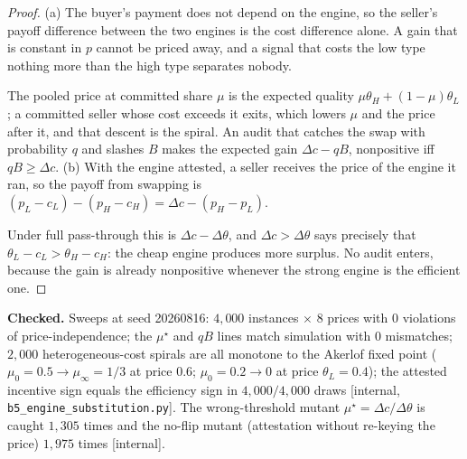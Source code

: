 \documentclass[11pt,a4paper]{article}
\theoremstyle{definition}
\begin{document}
\begin{proof}
\setlength{\parskip}{4pt plus 1pt}
(a) The buyer's payment does not depend on the engine, so the seller's payoff
difference between the two engines is the cost difference alone. A gain that
is constant in $p$ cannot be priced away, and a signal that costs the low type
nothing more than the high type separates nobody. 

The pooled price at
committed share $\mu$ is the expected quality $\mu\theta_H+(1-\mu)\theta_L$;
a committed seller whose cost exceeds it exits, which lowers $\mu$ and the
price after it, and that descent is the spiral. An audit that catches the
swap with probability $q$ and slashes $B$ makes the expected gain
$\Delta c-qB$, nonpositive iff $qB\ge\Delta c$.
(b) With the engine attested, a seller receives the price of the engine it
ran, so the payoff from swapping is $(p_L-c_L)-(p_H-c_H)=\Delta c-(p_H-p_L)$.


Under full pass-through this is $\Delta c-\Delta\theta$, and
$\Delta c>\Delta\theta$ says precisely that $\theta_L-c_L>\theta_H-c_H$: the
cheap engine produces more surplus. No audit enters, because the gain is
already nonpositive whenever the strong engine is the efficient one.
\end{proof}

\noindent\textbf{Checked.} Sweeps at seed 20260816: $4{,}000$ instances
$\times$ $8$ prices with $0$ violations of price-independence; the
$\mu^\star$ and $qB$ lines match simulation with $0$ mismatches; $2{,}000$
heterogeneous-cost spirals are all monotone to the Akerlof fixed point
($\mu_0=0.5\to\mu_\infty=1/3$ at price $0.6$; $\mu_0=0.2\to 0$ at price
$\theta_L=0.4$); the attested incentive sign equals the efficiency sign in
$4{,}000/4{,}000$ draws [internal, \texttt{b5\_engine\_substitution.py}].
The wrong-threshold mutant $\mu^\star=\Delta c/\Delta\theta$ is caught
$1{,}305$ times and the no-flip mutant (attestation without re-keying the
price) $1{,}975$ times [internal].
\end{document}
